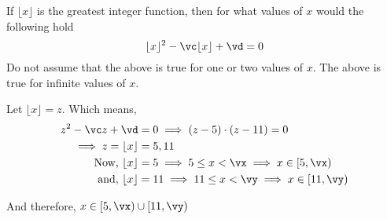 

\ADD\va\vb\vc
\MULTIPLY\va\vb\vd
\ADD{}\vx
\ADD{}\vy

\question[4] If $\lfloor x\rfloor$ is the greatest integer function, then for what values of $x$ would 
the following hold 
  \[
    \lfloor x\rfloor^2-\vc\lfloor x\rfloor + \vd = 0
  \]
  Do not assume that the above is true for one or two values of $x$. The above is true for infinite values of $x$.


\watchout

\begin{solution}[\halfpage]
  Let $\lfloor x\rfloor = z$. Which means,
  \begin{align}
    z^2 -\vc z + \vd &= 0 \implies (z-\va)\cdot (z-\vb) = 0 \\
    \implies z = \lfloor x\rfloor &= \va, \vb \\
    \text{ Now, } \lfloor x\rfloor &= \va \implies \va\leq x <\vx \implies x\in [\va,\vx) \\
    \text{ and, } \lfloor x\rfloor &= \vb \implies \vb\leq x <\vy \implies x\in [\vb,\vy)
  \end{align}

  And therefore, $x\in [\va,\vx)\cup [\vb,\vy)$

\end{solution}

